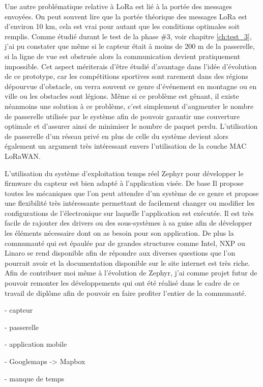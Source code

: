 Une autre problématique relative à LoRa est lié à la portée des messages envoyées. On peut souvent lire que la portée théorique des messages LoRa est d'environ 10 km, cela est vrai pour autant que les conditions optimales soit remplis. Comme étudié durant le test de la phase \#3, voir chapitre \ref{ch:test_3}, j'ai pu constater que même si le capteur était à moins de 200 m de la passerelle, si la ligne de vue est obstruée alors la communication devient pratiquement impossible. Cet aspect mériterais d'être étudié d'avantage dans l'idée d'évolution de ce prototype, car les compétitions sportives sont rarement dans des régions dépourvue d'obstacle, on verra souvent ce genre d'événement en montagne ou en ville ou les obstacles sont légions. Même si ce problème est gênant, il existe néanmoins une solution à ce problème, c'est simplement d'augmenter le nombre de passerelle utilisée par le système afin de pouvoir garantir une couverture optimale et d'assurer ainsi de minimiser le nombre de paquet perdu. L'utilisation de passerelle d'un réseau privé en plus de celle du système devient alors également un argument très intéressant envers l'utilisation de la couche MAC LoRaWAN.

 L'utilisation du système d'exploitation temps réel Zephyr pour développer le firmware du capteur est bien adapté à l'application visée. De base Il propose toutes les mécaniques que l'on peut attendre d'un système de ce genre et propose une flexibilité très intéressante permettant de facilement changer ou modifier les configurations de l'électronique sur laquelle l'application est exécutée. Il est très facile de rajouter des drivers ou des sous-systèmes à sa guise afin de développer les éléments nécessaire dont on as besoin pour son application. De plus la communauté qui est épaulée par de grandes structures comme Intel, NXP ou Linaro se rend disponible afin de répondre aux diverses questions que l'on pourrait avoir et la documentation disponible sur le site internet est très riche. Afin de contribuer moi même à l'évolution de Zephyr, j'ai comme projet futur de pouvoir remonter les développements qui ont été réalisé dans le cadre de ce travail de diplôme afin de pouvoir en faire profiter l'entier de la communauté.








- capteur

- passerelle

- application mobile

- Googlemaps -> Mapbox

- manque de temps